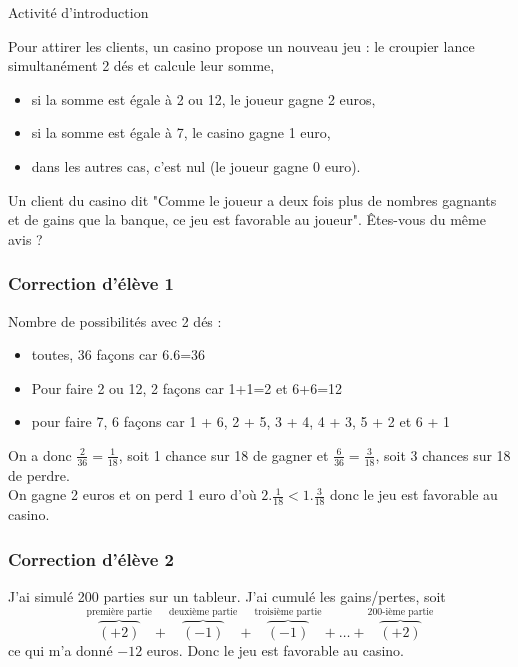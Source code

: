 \documentclass{book}
\begin{document}
\begin{center}
\begin{Large}
Activité d'introduction
\end{Large}
\end{center}
Pour attirer les clients, un casino propose un nouveau jeu : le croupier lance simultanément 2 dés et calcule leur somme,
\begin{itemize} 
\item si la somme est égale à 2 ou 12, le joueur gagne 2 euros,
\item si la somme est égale à 7, le casino gagne 1 euro,
\item dans les autres cas, c'est nul (le joueur gagne 0 euro).  
\end{itemize}
Un client du casino dit "Comme le joueur a deux fois plus de nombres gagnants et de gains que la banque, ce jeu est favorable au joueur". Êtes-vous du même avis ?

\subsubsection*{Correction d'élève 1} 
Nombre de possibilités avec 2 dés :
\begin{itemize}
\item  toutes,  36 façons car 6.6=36
\item Pour faire 2 ou 12, 2 façons car 1+1=2 et 6+6=12
\item pour faire 7, 6 façons car 1 + 6, 2 + 5, 3 + 4, 4 + 3, 5 + 2 et  6 + 1  
\end{itemize}
On a donc $\frac{2}{36}=\frac{1}{18}$, soit 1 chance sur 18 de gagner et $\frac{6}{36}=\frac{3}{18}$, soit 3 chances sur 18 de perdre.\\
On gagne 2 euros et on perd 1 euro d'où  $2.\frac{1}{18}<1.\frac{3}{18}$ donc le jeu est favorable au casino.

\subsubsection*{Correction d'élève 2}
J'ai simulé 200 parties sur un tableur. J'ai cumulé les gains/pertes, soit \[
\overbrace{(+2)}^{\text{première partie}}+\overbrace{(-1)}^{\text{deuxième partie}}+\overbrace{(-1)}^{\text{troisième partie}}+\dots+\overbrace{(+2)}^{\text{200-ième partie}}\] ce qui m'a donné $-12$ euros.  Donc le jeu est favorable au casino.   
\end{document}
